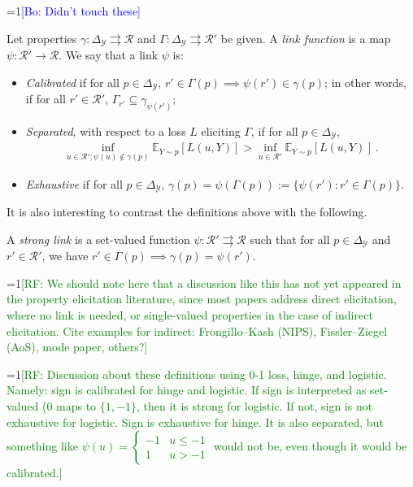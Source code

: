 \documentclass[anon,12pt]{colt2019}
\newcommand{\Comments}{1}
\newcommand{\mynote}[2]{\ifnum\Comments=1\textcolor{#1}{#2}\fi}
\newcommand{\raf}[1]{\mynote{green}{[RF: #1]}}
\newcommand{\bo}[1]{\mynote{blue}{[Bo: #1]}}
\newcommand{\simplex}{\Delta_\Y}
\newcommand{\E}{\mathbb{E}}
\newcommand{\R}{\mathcal{R}}
\newcommand{\Y}{\mathcal{Y}}
\newcommand{\toto}{\rightrightarrows}
\begin{document}
\bo{Didn't touch these}
\begin{definition}\label{def:links}
  Let properties $\gamma:\simplex\toto\R$ and $\Gamma:\simplex\toto\R'$ be given.
  A \emph{link function} is a map $\psi:\R'\to\R$.
  We say that a link $\psi$ is:
  \begin{itemize}
  \item \emph{Calibrated} if for all $p\in\simplex$, $r'\in \Gamma(p) \implies \psi(r') \in \gamma(p)$; in other words, if for all $r'\in\R'$, $\Gamma_{r'} \subseteq \gamma_{\psi(r')}$;
  \item \emph{Separated}, with respect to a loss $L$ eliciting $\Gamma$, if for all $p \in \simplex$,
  \begin{align*}
  \inf_{u \in \R'; \psi(u) \not \in \gamma(p)} \E_{Y\sim p}[L(u, Y)] > \inf_{u \in \R'}\E_{Y\sim p}[L(u, Y)]~.
  \end{align*}
  \item \emph{Exhaustive} if for all $p\in\simplex$, $\gamma(p) = \psi(\Gamma(p)) := \{\psi(r') : r'\in\Gamma(p)\}$.
  \end{itemize}
\end{definition}

It is also interesting to contrast the definitions above with the following.
\begin{definition}
  A \emph{strong link} is a set-valued function $\psi:\R'\toto\R$ such that for all $p\in\simplex$ and $r'\in\R'$, we have $r'\in\Gamma(p) \implies \gamma(p) = \psi(r')$.
\end{definition}

\raf{We should note here that a discussion like this has not yet appeared in the property elicitation literature, since most papers address direct elicitation, where no link is needed, or single-valued properties in the case of indirect elicitation.  Cite examples for indirect: Frongillo--Kash (NIPS), Fissler--Ziegel (AoS), mode paper, others?}

\raf{Discussion about these definitions using 0-1 loss, hinge, and logistic.  Namely: sign is calibrated for hinge and logistic.  If sign is interpreted as set-valued (0 maps to $\{1,-1\}$, then it is strong for logistic.  If not, sign is not exhaustive for logistic.  Sign is exhaustive for hinge.  It is also separated, but something like $\psi(u) =
  \begin{cases}
    -1 & u \leq -1\\
    1 & u > -1
  \end{cases}$
  would not be, even though it would be calibrated.}
\end{document}
